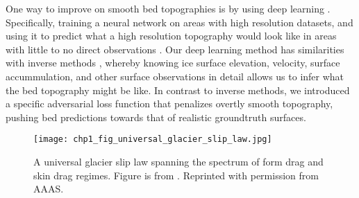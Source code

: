 One way to improve on smooth bed topographies is by using deep learning \citep[see][for a review]{GoodfellowDeeplearning2016}.
Specifically, training a neural network on areas with high resolution datasets, and using it to predict what a high resolution topography would look like in areas with little to no direct observations \citep[Chp.~\ref{ch:2},][]{LeongDeepBedMapdeepneural2020}.
Our deep learning method has similarities with inverse methods \citep{GudmundssonInverseMethodsGlaciology2011}, whereby knowing ice surface elevation, velocity, surface accummulation, and other surface observations in detail allows us to infer what the bed topography might be like.
In contrast to inverse methods, we introduced a specific adversarial loss function \citep{GoodfellowGenerativeAdversarialNetworks2014} that penalizes overtly smooth topography, pushing bed predictions towards that of realistic groundtruth surfaces.

\begin{figure}[htb]
  \centering
  \texttt{[image: chp1\_fig\_universal\_glacier\_slip\_law.jpg]}
  \caption[Universal glacier slip law]{
    A universal glacier slip law spanning the spectrum of form drag and skin drag regimes.
    Figure is from \citet{Minchewuniversalglacierslip2020}.
    Reprinted with permission from AAAS.
  }
  \label{fig:1.3}
\end{figure}

